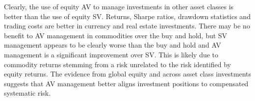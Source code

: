 Clearly, the use of equity AV to manage investments in other asset classes is better than the use of equity SV. Returns, Sharpe ratios, drawdown statistics and trading costs are better in currency and real estate investments. There may be no benefit to AV management in commodities over the buy and hold, but SV management appears to be clearly worse than the buy and hold and AV management is a significant improvement over SV. This is likely due to commodity returns stemming from a risk unrelated to the risk identified by equity returns. The evidence from global equity and across asset class investments suggests that AV management better aligns investment positions to compensated systematic risk.